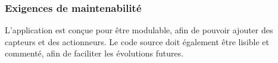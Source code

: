 \subsubsection{Exigences de maintenabilité}
L'application {\nomApplication}  est conçue pour être modulable, afin de pouvoir ajouter des capteurs et des actionneurs. Le code source doit également être lisible et commenté, afin de faciliter les évolutions futures.